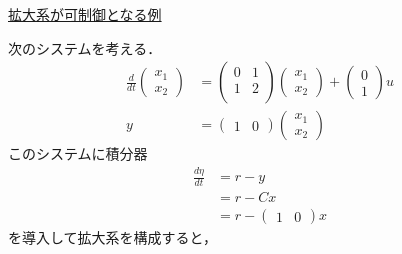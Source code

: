 \noindent
\underline{拡大系が可制御となる例}\nopagebreak

次のシステムを考える．
\begin{align}
 \frac{d}{dt}
 \left(
 \begin{array}{c}
  x_1 \\
  x_2
 \end{array}
 \right) &=
 \left(
 \begin{array}{cc}
  0 & 1 \\
  1 & 2 \\
 \end{array}
 \right)
 \left(
 \begin{array}{c}
  x_1 \\
  x_2
 \end{array}
 \right) +
 \left(
 \begin{array}{c}
  0 \\
  1
 \end{array}
 \right) u \\
 y &= 
 \left(
 \begin{array}{cc}
  1 & 0
 \end{array}
 \right)
 \left(
 \begin{array}{c}
  x_1 \\
  x_2
 \end{array}
 \right)
\end{align}
このシステムに積分器
\begin{align}
 \frac{d\eta}{dt} &= r - y \\
 &= r - Cx \\
 &= r - \left(\begin{array}{cc}1 & 0 \end{array}\right)x
\end{align}
を導入して拡大系を構成すると，

